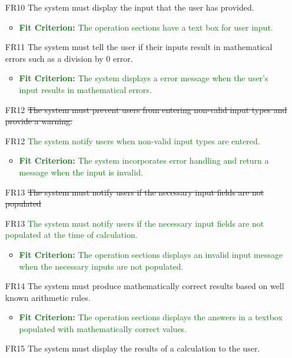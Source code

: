 \documentclass[12pt, titlepage]{article}
\begin{document}
\begin{enumerate}
\item [FR10] The system must display the input that the user has provided.
\begin{itemize}
  \item \textcolor{Green}{\textbf{Fit Criterion:} The operation sections have a text box for user input.}
\end{itemize}
\item [FR11] The system must tell the user if their inputs result in mathematical errors such as a division by 0 error.
\begin{itemize}
  \item \textcolor{Green}{\textbf{Fit Criterion:} The system displays a error message when the user's input results in mathematical errors.}
\end{itemize}
\item [FR12] \sout{The system must prevent users from entering non-valid input types and provide a warning.}
\item [FR12] \textcolor{Green}{The system notify users when non-valid input types are entered.}
\begin{itemize}
  \item \textcolor{Green}{\textbf{Fit Criterion:} The system incorporates error handling and return a message when the input is invalid.}
\end{itemize}
\item [FR13] \sout{The system must notify users if the necessary input fields are not populated}
\item [FR13] \textcolor{Green}{The system must notify users if the necessary input fields are not populated at the time of calculation.}
\begin{itemize}
  \item \textcolor{Green}{\textbf{Fit Criterion:} The operation sections displays an invalid input message when the necessary inputs are not populated.}
\end{itemize}
\item [FR14] The system must produce mathematically correct results based on well known arithmetic rules.
\begin{itemize}
  \item \textcolor{Green}{\textbf{Fit Criterion:} The operation sections displays the answers in a textbox populated with mathematically correct values.}
\end{itemize}
\item [FR15] The system must display the results of a calculation to the user.
\begin{itemize}

\end{itemize}
\end{enumerate}
\end{document}
